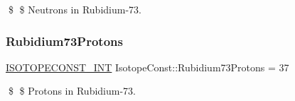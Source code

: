 \$ \$ Neutrons in Rubidium-\/73. \mbox{\label{group___isotope_const-_rubidium-_rb73_gae99d0713df0c3828a8817dccaf2ce230}} 
\subsubsection{\texorpdfstring{Rubidium73\+Protons}{Rubidium73Protons}}
{\footnotesize\ttfamily \mbox{\hyperlink{group___isotope_const-_macros_ga5f18360b3e99483a35c32d789e62621c}{I\+S\+O\+T\+O\+P\+E\+C\+O\+N\+S\+T\+\_\+\+I\+NT}} Isotope\+Const\+::\+Rubidium73\+Protons = 37}

\$ \$ Protons in Rubidium-\/73. 